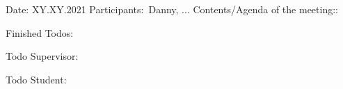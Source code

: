 Date: XY.XY.2021
Participants: Danny, ...
Contents/Agenda of the meeting::

Finished Todos:

Todo Supervisor:

Todo Student:
